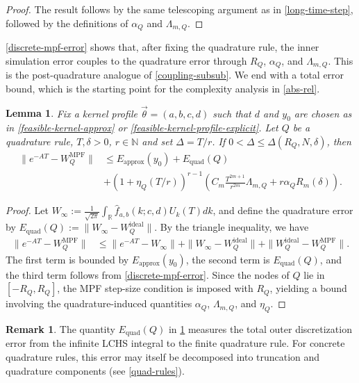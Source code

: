 \documentclass[10pt,reqno]{article}
\numberwithin{equation}{section}
\theoremstyle{plain}
\newtheorem{lem}[thm]{Lemma}
\theoremstyle{definition}
\newtheorem{remark}[thm]{Remark}
\begin{document}
\begin{proof}
The result follows by the same telescoping argument as in \cref{long-time-step}, followed by the definitions of $\alpha_Q$ and $\Lambda_{m,Q}$.
\end{proof}

\cref{discrete-mpf-error} shows that, after fixing the quadrature rule, the inner simulation error couples to the quadrature error through \(R_Q\), \(\alpha_Q\), and \(\Lambda_{m,Q}\). This is the post-quadrature analogue of \cref{coupling-subsub}. We end with a total error bound, which is the starting point for the complexity analysis in \cref{abs-rel}.

\begin{lem}\label{post-quadrature-error-decomposition-general}
Fix a kernel profile \(\vec{\theta}=(a,b,c,d)\) such that $d$ and $y_0$ are chosen as in \cref{feasible-kernel-approx} or \cref{feasible-kernel-profile-explicit}. Let $Q$ be a quadrature rule, $T, \delta>0$, $r\in\mathbb N$ and set $\Delta=T/r$. If $0<\Delta\le \Delta(R_Q,N,\delta)$, then
\begin{align}\label{post-quadrature-error-general}
\|e^{-AT}-W_Q^{\mathrm{MPF}}\| &\le E_{\mathrm{approx}}(y_0) + E_{\mathrm{quad}}(Q) \\ & + (1+\eta_Q(T/r))^{r-1} \left( C_m\frac{T^{2m+1}}{r^{2m}}\Lambda_{m,Q} + r\alpha_QR_m(\delta) \right).
\end{align}
\end{lem}

\begin{proof}
Let $W_\infty := \frac{1}{\sqrt{2\pi}} \int_{\mathbb R} \hat f_{a,b}(k;c,d) U_k(T) dk$, and define the quadrature error by $E_{\mathrm{quad}}(Q) := \|W_\infty - W_Q^{\mathrm{ideal}}\|$. By the triangle inequality, we have
\begin{align}
\|e^{-AT}-W_Q^{\mathrm{MPF}}\| &\le \|e^{-AT}-W_\infty\| + \|W_\infty-W_Q^{\mathrm{ideal}}\| + \|W_Q^{\mathrm{ideal}}-W_Q^{\mathrm{MPF}}\|.
\end{align}
The first term is bounded by \(E_{\mathrm{approx}}(y_0)\), the second term is \(E_{\mathrm{quad}}(Q)\), and the third term follows from \cref{discrete-mpf-error}. Since the nodes of \(Q\) lie in \([-R_Q,R_Q]\), the MPF step-size condition is imposed with \(R_Q\), yielding a bound involving the quadrature-induced quantities \(\alpha_Q\), \(\Lambda_{m,Q}\), and \(\eta_Q\).
\end{proof}

\begin{remark} The quantity \(E_{\mathrm{quad}}(Q)\) in \cref{post-quadrature-error-decomposition-general} measures the total outer discretization error from the infinite LCHS integral to the finite quadrature rule. For concrete quadrature rules, this error may itself be decomposed into truncation and quadrature components (see \cref{quad-rules}).
\end{remark}
\end{document}
